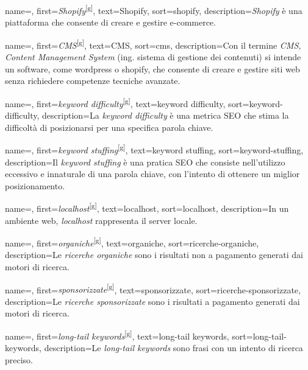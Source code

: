  {
    name=,
    first={\textit{Shopify}\textsuperscript{[g]}},
    text=Shopify,
    sort=shopify,
    description={\emph{Shopify} è una piattaforma che consente di creare e gestire e-commerce.}
}

 {
    name=,
    first={\textit{CMS}\textsuperscript{[g]}},
    text=CMS,
    sort=cms,
    description={Con il termine \emph{CMS, Content Management System} (ing. sistema di gestione dei contenuti) si intende un software, come \gls{wordpress} o \gls{shopify}, che consente di creare e gestire siti web senza richiedere competenze tecniche avanzate.}
}

 {
    name=,
    first={\textit{keyword difficulty}\textsuperscript{[g]}},
    text=keyword difficulty,
    sort=keyword-difficulty,
    description={La \emph{keyword difficulty} è una metrica SEO che stima la difficoltà di posizionarsi per una specifica parola chiave.}
}

 {
    name=,
    first={\textit{keyword stuffing}\textsuperscript{[g]}},
    text=keyword stuffing,
    sort=keyword-stuffing,
    description={Il \emph{keyword stuffing} è una pratica SEO che consiste nell'utilizzo eccessivo e innaturale di una parola chiave, con l'intento di ottenere un miglior posizionamento.}
}

 {
    name=,
    first={\textit{localhost}\textsuperscript{[g]}},
    text=localhost,
    sort=localhost,
    description={In un ambiente web, \emph{localhost} rappresenta il server locale.}
}

 {
    name=,
    first={\textit{organiche}\textsuperscript{[g]}},
    text=organiche,
    sort=ricerche-organiche,
    description={Le \emph{ricerche organiche} sono i risultati non a pagamento generati dai motori di ricerca.}
}

 {
    name=,
    first={\textit{sponsorizzate}\textsuperscript{[g]}},
    text=sponsorizzate,
    sort=ricerche-sponsorizzate,
    description={Le \emph{ricerche sponsorizzate} sono i risultati a pagamento generati dai motori di ricerca.}
}

 {
    name=,
    first={\textit{long-tail keywords}\textsuperscript{[g]}},
    text=long-tail keywords,
    sort=long-tail-keywords,
    description={Le \emph{long-tail keywords} sono frasi con un intento di ricerca preciso.}
}

